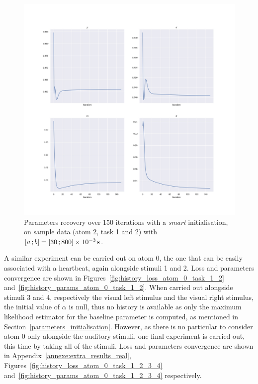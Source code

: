 \begin{figure}[h!]
    \centering
    \includegraphics[width=\textwidth]{pics/results_sample/history_params_atom_2_task_1_2.jpg}
    \caption{Parameters recovery over 150 iterations with a \textit{smart} initialisation, on sample data (atom 2, task 1 and 2) with $\left[ a \, ; b \right] = \left[ 30 \, ; 800 \right]\times \SI{e-3}{\second}$.}
    \label{fig:history_params_atom_2_task_1_2}
\end{figure}

A similar experiment can be carried out on atom 0, the one that can be easily associated with a heartbeat, again alongside stimuli 1 and 2.
Loss and parameters convergence are shown in Figures~\ref{fig:history_loss_atom_0_task_1_2} and~\ref{fig:history_params_atom_0_task_1_2}.
When carried out alongside stimuli 3 and 4, respectively the visual left stimulus and the visual right stimulus, the initial value of $\alpha$ is null, thus no history is available as only the maximum likelihood estimator for the baseline parameter is computed, as mentioned in Section~\ref{parameters_initialisation}.
However, as there is no particular to consider atom 0 only alongside the auditory stimuli, one final experiment is carried out, this time by taking all of the stimuli.
Loss and parameters convergence are shown in Appendix~\ref{annexe:extra_results_real}, Figures~\ref{fig:history_loss_atom_0_task_1_2_3_4} and~\ref{fig:history_params_atom_0_task_1_2_3_4} respectively.

